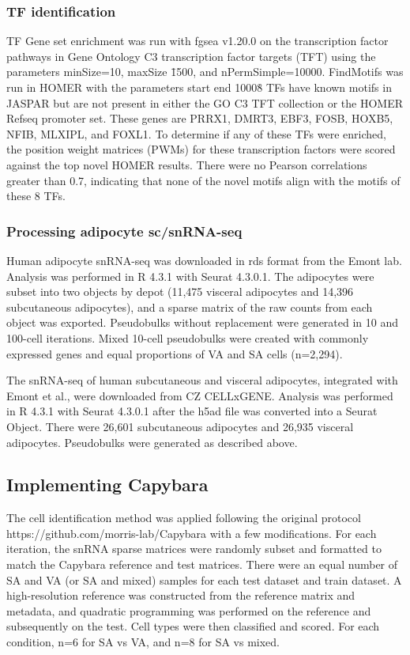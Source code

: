 \subsubsection{TF identification}
TF Gene set enrichment was run with fgsea v1.20.0\cite{Korotkevich2021-ra} on the transcription factor pathways in Gene Ontology C3 transcription factor targets (TFT) using the parameters minSize=10, maxSize \= 1500, and nPermSimple=10000\cite{Subramanian2005-bj,Mootha2003-ys}. FindMotifs was run in HOMER with the parameters \-start  \-end 1000\. 8 TFs have known motifs in JASPAR but are not present in either the GO C3 TFT collection or the HOMER Refseq promoter set. These genes are PRRX1, DMRT3, EBF3, FOSB, HOXB5, NFIB, MLXIPL, and FOXL1. To determine if any of these TFs were enriched, the position weight matrices (PWMs) for these transcription factors were scored against the top novel HOMER results. There were no Pearson correlations greater than 0.7, indicating that none of the novel motifs align with the motifs of these 8 TFs.  

\subsubsection{Processing adipocyte sc/snRNA-seq}
Human adipocyte snRNA-seq was downloaded in rds format from the Emont lab\cite{Emont2022-pb}. Analysis was performed in R 4.3.1 with Seurat 4.3.0.1. The adipocytes were subset into two objects by depot (11,475 visceral adipocytes and 14,396 subcutaneous adipocytes), and a sparse matrix of the raw counts from each object was exported. Pseudobulks without replacement were generated in 10 and 100-cell iterations. Mixed 10-cell pseudobulks were created with commonly expressed genes and equal proportions of VA and SA cells (n=2,294).  

The snRNA-seq of human subcutaneous and visceral adipocytes, integrated with Emont et al., were downloaded from CZ CELLxGENE\cite{Lazarescu2025-ru,CZI-Cell-Science-Program2025-eh}. Analysis was performed in R 4.3.1 with Seurat 4.3.0.1 after the h5ad file was converted into a Seurat Object. There were 26,601 subcutaneous adipocytes and 26,935 visceral adipocytes. Pseudobulks were generated as described above. 

\subsection{Implementing Capybara}
The cell identification method was applied following the original protocol \newline https://github.com/morris-lab/Capybara with a few modifications\cite{Kong2022-pg}. For each iteration, the snRNA sparse matrices were randomly subset and formatted to match the Capybara reference and test matrices. There were an equal number of SA and VA (or SA and mixed) samples for each test dataset and train dataset. A high-resolution reference was constructed from the reference matrix and metadata, and quadratic programming was performed on the reference and subsequently on the test. Cell types were then classified and scored. For each condition, n=6 for SA vs VA, and n=8 for SA vs mixed.

